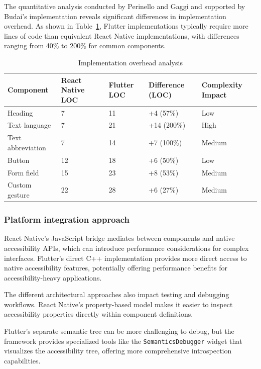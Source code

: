 The quantitative analysis conducted by Perinello and Gaggi \cite{perinello2024accessibility} and supported by Budai's implementation \cite{budai2024mobile} reveals significant differences in implementation overhead. As shown in Table~\ref{tab:implementation_overhead_analysis}, Flutter implementations typically require more lines of code than equivalent React Native implementations, with differences ranging from 40\% to 200\% for common components.

\begin{table}[ht]
\caption{Implementation overhead analysis}
\label{tab:implementation_overhead_analysis}
\centering
\begin{tabular}{|p{2.5cm}|p{2.5cm}|p{2.5cm}|p{2.5cm}|p{2.5cm}|}
\hline
\textbf{Component} & \textbf{React Native LOC} & \textbf{Flutter LOC} & \textbf{Difference (LOC)} & \textbf{Complexity Impact} \\
\hline
Heading & 7 & 11 & +4 (57\%) & Low \\
\hline
Text language & 7 & 21 & +14 (200\%) & High \\
\hline
Text abbreviation & 7 & 14 & +7 (100\%) & Medium \\
\hline
Button & 12 & 18 & +6 (50\%) & Low \\
\hline
Form field & 15 & 23 & +8 (53\%) & Medium \\
\hline
Custom gesture & 22 & 28 & +6 (27\%) & Medium \\
\hline
\end{tabular}
\end{table}

\pagebreak

\subsubsection{Platform integration approach}
React Native's JavaScript bridge mediates between components and native accessibility APIs, which can introduce performance considerations for complex interfaces. Flutter's direct C++ implementation provides more direct access to native accessibility features, potentially offering performance benefits for accessibility-heavy applications.

The different architectural approaches also impact testing and debugging workflows. React Native's property-based model makes it easier to inspect accessibility properties directly within component definitions.

Flutter's separate semantic tree can be more challenging to debug, but the framework provides specialized tools like the \texttt{SemanticsDebugger} widget that visualizes the accessibility tree, offering more comprehensive introspection capabilities.

